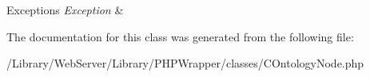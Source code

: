 \begin{DoxyExceptions}{Exceptions}
{\em Exception} & \\
\hline
\end{DoxyExceptions}


The documentation for this class was generated from the following file\-:\begin{DoxyCompactItemize}
\item 
/\-Library/\-Web\-Server/\-Library/\-P\-H\-P\-Wrapper/classes/C\-Ontology\-Node.\-php\end{DoxyCompactItemize}

